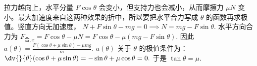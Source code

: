拉力越向上，水平分量 \(F\cos\theta\) 会变小，但支持力也会减小，从而摩擦力 \(\mu N\) 变小。最大加速度来自这两种效果的折中，所以要把水平合力写成 \(\theta\) 的函数再求极值。竖直方向无加速度，
 \(N+F\sin\theta-mg=0 \implies N=mg-F\sin\theta.\) 
水平方向合力为 \(F_{\text{合},x}=F\cos\theta-\mu N =F\cos\theta-\mu(mg-F\sin\theta).\) 
因此 \(a(\theta)=\frac{F(\cos\theta+\mu\sin\theta)-\mu mg}{m}.\) 
\(a(\theta)\) 关于 \(\theta\) 的极值条件为： \(\dv{}{\theta}(\cos\theta+\mu\sin\theta) =-\sin\theta+\mu\cos\theta=0.\) 
于是 \(\tan\theta=\mu.\) 
